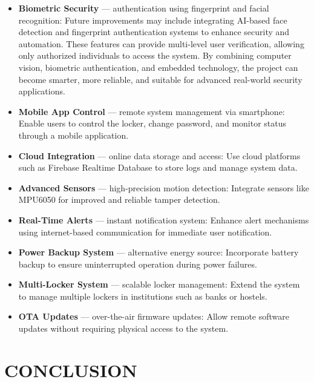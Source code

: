 \documentclass[conference]{IEEEtran}
\begin{document}
\begin{itemize}

\item \textbf{Biometric Security} --- authentication using fingerprint and facial recognition:
Future improvements may include integrating AI-based face detection and fingerprint authentication systems to enhance security and automation. These features can provide multi-level user verification, allowing only authorized individuals to access the system. By combining computer vision, biometric authentication, and embedded technology, the project can become smarter, more reliable, and suitable for advanced real-world security applications.

\item \textbf{Mobile App Control} --- remote system management via smartphone:  
Enable users to control the locker, change password, and monitor status through a mobile application.

\item \textbf{Cloud Integration} --- online data storage and access:  
Use cloud platforms such as Firebase Realtime Database to store logs and manage system data.

\item \textbf{Advanced Sensors} --- high-precision motion detection:  
Integrate sensors like MPU6050 for improved and reliable tamper detection.

\item \textbf{Real-Time Alerts} --- instant notification system:  
Enhance alert mechanisms using internet-based communication for immediate user notification.

\item \textbf{Power Backup System} --- alternative energy source:  
Incorporate battery backup to ensure uninterrupted operation during power failures.

\item \textbf{Multi-Locker System} --- scalable locker management:  
Extend the system to manage multiple lockers in institutions such as banks or hostels.

\item \textbf{OTA Updates} --- over-the-air firmware updates:  
Allow remote software updates without requiring physical access to the system.


\end{itemize}

\section{CONCLUSION}
\end{document}
